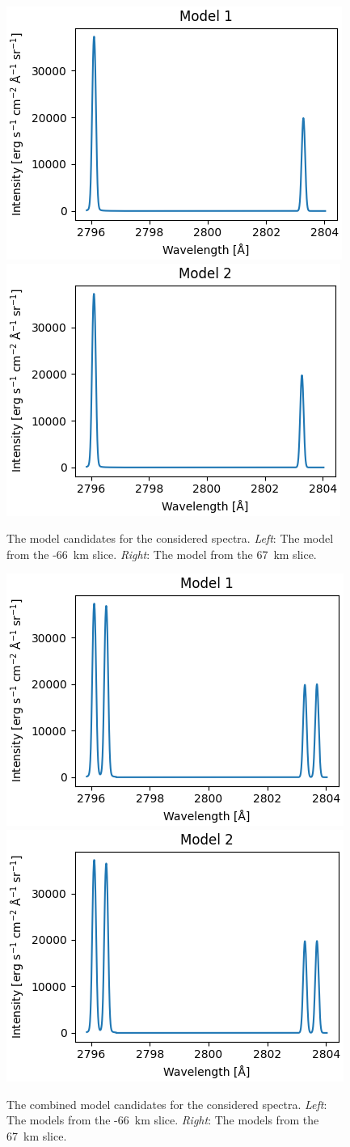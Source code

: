 \begin{figure}
    \includegraphics[width=0.49\linewidth]{./03Modelling2D/figs/invert/model1.png}
    \includegraphics[width=0.49\linewidth]{./03Modelling2D/figs/invert/model2.png}
    \caption[The model candidates for the considered spectra.]{The model candidates for the considered spectra. \textit{Left}: The model from the -66~km slice. \textit{Right}: The model from the 67~km slice.}
    \label{models} \vspace{20pt}
    \includegraphics[width=0.49\linewidth]{./03Modelling2D/figs/invert/model1tot.png}
    \includegraphics[width=0.49\linewidth]{./03Modelling2D/figs/invert/model2tot.png}
    \caption[The combined model candidates for the considered spectra.]{The combined model candidates for the considered spectra. \textit{Left}: The models from the -66~km slice. \textit{Right}: The models from the 67~km slice.}
    \label{modelsfull}
\end{figure}

